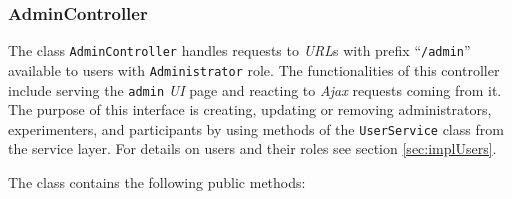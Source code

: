 \documentclass[a4paper]{usiinfbachelorproject}
\begin{document}
\subsubsection{\textbf{AdminController}}

The class \texttt{AdminController} handles requests to \emph{URL}s with prefix ``\texttt{/admin}'' available to users with \texttt{Administrator} role.
The functionalities of this controller include serving the \texttt{admin} \emph{UI} page and reacting to \emph{Ajax} requests coming from it.
The purpose of this interface is creating, updating or removing administrators, experimenters, 
and participants by using methods of the \texttt{UserService} class
from the service layer. For details on users and their roles see section \ref{sec:implUsers}.

The class contains the following public methods:
\end{document}

